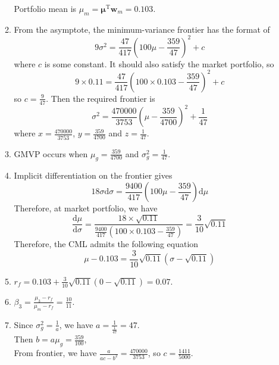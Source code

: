 \documentclass[12pt]{article}
\newcommand{\diff}{\mathrm{d}}
\theoremstyle{definition}
\begin{document}
\begin{enumerate}
\begin{enumerate}
\[    \]
    Portfolio mean is $\mu_m = \bm{\mu}^\text{T}\mathbf{w}_m=0.103$.
    \item From the asymptote, the minimum-variance frontier has the format of
    \[
9\sigma^2=\frac{47}{417}(100\mu-\frac{359}{47})^2+c
    \]
    where $c$ is some constant. It should also satisfy the market portfolio, so
    \[
9\times 0.11 = \frac{47}{417}(100\times 0.103-\frac{359}{47})^2+c
    \]
    so $c=\frac{9}{47}$. Then the required frontier is
    \[
\sigma^2 = \frac{470000}{3753}(\mu-\frac{359}{4700})^2+\frac{1}{47}
    \]
    where $x=\frac{470000}{3753}$, $y=\frac{359}{4700}$ and $z=\frac{1}{47}$.
    \item GMVP occurs when $\mu_g=\frac{359}{4700}$ and $\sigma^2_g=\frac{1}{47}$.
    \item Implicit differentiation on the frontier gives
    \[
18\sigma\diff\sigma = \frac{9400}{417}(100\mu-\frac{359}{47})\diff\mu
    \]
    Therefore, at market portfolio, we have
    \[
\frac{\diff\mu}{\diff\sigma}=\frac{18\times \sqrt{0.11}}{\frac{9400}{417}(100\times 0.103-\frac{359}{47})}=\frac{3}{10}\sqrt{0.11}
    \]
    Therefore, the CML admits the following equation
    \[
\mu-0.103=\frac{3}{10}\sqrt{0.11}(\sigma-\sqrt{0.11})
    \]
    \item $r_f = 0.103+\frac{3}{10}\sqrt{0.11}(0-\sqrt{0.11})=0.07$.
    \item $\beta_3 = \frac{\mu_3-r_f}{\mu_m-r_f}=\frac{10}{11}$.
    \item Since $\sigma_g^2=\frac{1}{a}$, we have $a = \frac{1}{\frac{1}{47}}=47$.\\
    Then $b = a\mu_g = \frac{359}{100}$,\\
    From frontier, we have $\frac{a}{ac-b^2}=\frac{470000}{3753}$, so $c = \frac{1411}{5000}$.
  \end{enumerate} 
\end{enumerate}
\end{document}
